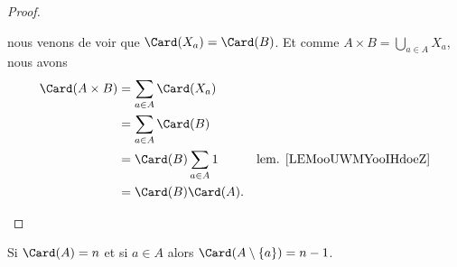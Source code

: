 \begin{proof}
\begin{subproof}
		nous venons de voir que \( \Card(X_a)=\Card(B)\). Et comme \( A\times B=\bigcup_{a\in A}X_a\), nous avons
		\begin{subequations}
			\begin{align}
				\Card(A\times B) & =\sum_{a\in A}\Card(X_a)                                       \\
				                 & =\sum_{a\in A}\Card(B)                                         \\
				                 & =\Card(B)\sum_{a\in A}1  & \text{lem. \ref{LEMooUWMYooIHdoeZ}} \\
				                 & =\Card(B)\Card(A).
			\end{align}
		\end{subequations}
	\end{subproof}
\end{proof}



\begin{lemma}	\label{LEMooRURDooRIGJnY}
	Si \( \Card(A)=n\) et si \( a\in A\) alors \( \Card(A\setminus\{ a \})=n-1\).
\end{lemma}

